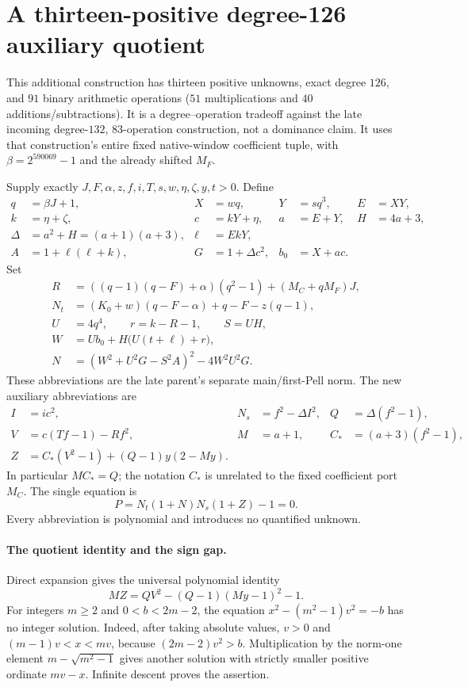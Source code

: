 \section{A thirteen-positive degree-126 auxiliary quotient}
\label{sec:positive13-quotient}
This additional construction has thirteen positive unknowns, exact degree
$126$, and $91$ binary arithmetic operations ($51$ multiplications and
$40$ additions/subtractions). It is a degree--operation tradeoff against the
late incoming degree-$132$, $83$-operation construction, not a dominance
claim. It uses that construction's entire fixed native-window coefficient
tuple, with $\beta=2^{590069}-1$ and the already shifted $M_F$.

Supply exactly $J,F,\alpha,z,f,i,T,s,w,\eta,\zeta,y,t>0$. Define
\begin{align*}
q&=\beta J+1,&X&=wq,&Y&=sq^3,&E&=XY,\\
k&=\eta+\zeta,&c&=kY+\eta,&a&=E+Y,&H&=4a+3,\\
\Delta&=a^2+H=(a+1)(a+3),&\ell&=EkY,\\
A&=1+\ell(\ell+k),&G&=1+\Delta c^2,&b_0&=X+ac.
\end{align*}
Set
\begin{align*}
R&=((q-1)(q-F)+\alpha)(q^2-1)+(M_C+qM_F)J,\\
N_t&=(K_0+w)(q-F-\alpha)+q-F-z(q-1),\\
U&=4q^4,\qquad r=k-R-1,\qquad S=UH,\\
W&=Ub_0+H\bigl(U(t+\ell)+r\bigr),\\
N&=(W^2+U^2G-S^2A)^2-4W^2U^2G.
\end{align*}
These abbreviations are the late parent's separate main/first-Pell norm.
The new auxiliary abbreviations are
\begin{align*}
I&=ic^2,&N_s&=f^2-\Delta I^2,&Q&=\Delta(f^2-1),\\
V&=c(Tf-1)-Rf^2,&M&=a+1,&C_*&=(a+3)(f^2-1),\\
Z&=C_*(V^2-1)+(Q-1)y(2-My).
\end{align*}
In particular $MC_*=Q$; the notation $C_*$ is unrelated to the fixed
coefficient port $M_C$. The single equation is
\[
\boxed{\quad P=N_t(1+N)N_s(1+Z)-1=0.\quad}
\]
Every abbreviation is polynomial and introduces no quantified unknown.

\paragraph{The quotient identity and the sign gap.}
Direct expansion gives the universal polynomial identity
\[
MZ=QV^2-(Q-1)(My-1)^2-1.                       \tag{*}
\]
For integers $m\ge2$ and $0<b<2m-2$, the equation
$x^2-(m^2-1)v^2=-b$ has no integer solution. Indeed, after taking absolute
values, $v>0$ and $(m-1)v<x<mv$, because
$(2m-2)v^2>b$. Multiplication by the norm-one element
$m-\sqrt{m^2-1}$ gives another solution with strictly smaller positive
ordinate $mv-x$. Infinite descent proves the assertion.

